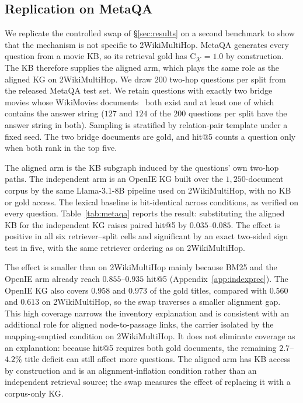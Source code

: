 \documentclass[11pt]{article}
\newcommand{\C}{\mathrm{C}}
\newcommand{\kg}{\mathcal{K}}
\begin{document}
\subsection{Replication on MetaQA}
\label{app:metaqa}
We replicate the controlled swap of \S\ref{sec:results} on a second benchmark to show that the mechanism is not specific to 2WikiMultiHop. MetaQA generates every question from a movie KB, so its retrieval gold has $\C_{\kg}=1.0$ by construction. The KB therefore supplies the aligned arm, which plays the same role as the aligned KG on 2WikiMultiHop. We draw $200$ two-hop questions per split from the released MetaQA test set. We retain questions with exactly two bridge movies whose WikiMovies documents~\citep{miller2016kvmemnn} both exist and at least one of which contains the answer string ($127$ and $124$ of the $200$ questions per split have the answer string in both). Sampling is stratified by relation-pair template under a fixed seed. The two bridge documents are gold, and hit@5 counts a question only when both rank in the top five.

The aligned arm is the KB subgraph induced by the questions' own two-hop paths. The independent arm is an OpenIE KG built over the $1{,}250$-document corpus by the same Llama-3.1-8B pipeline used on 2WikiMultiHop, with no KB or gold access. The lexical baseline is bit-identical across conditions, as verified on every question. Table~\ref{tab:metaqa} reports the result: substituting the aligned KB for the independent KG raises paired hit@5 by $0.035$--$0.085$. The effect is positive in all six retriever--split cells and significant by an exact two-sided sign test in five, with the same retriever ordering as on 2WikiMultiHop.

The effect is smaller than on 2WikiMultiHop mainly because BM25 and the OpenIE arm already reach $0.855$--$0.935$ hit@5 (Appendix~\ref{app:indexprec}). The OpenIE KG also covers $0.958$ and $0.973$ of the gold titles, compared with $0.560$ and $0.613$ on 2WikiMultiHop, so the swap traverses a smaller alignment gap. This high coverage narrows the inventory explanation and is consistent with an additional role for aligned node-to-passage links, the carrier isolated by the mapping-emptied condition on 2WikiMultiHop. It does not eliminate coverage as an explanation: because hit@5 requires both gold documents, the remaining $2.7$--$4.2\%$ title deficit can still affect more questions. The aligned arm has KB access by construction and is an alignment-inflation condition rather than an independent retrieval source; the swap measures the effect of replacing it with a corpus-only KG.
\end{document}
